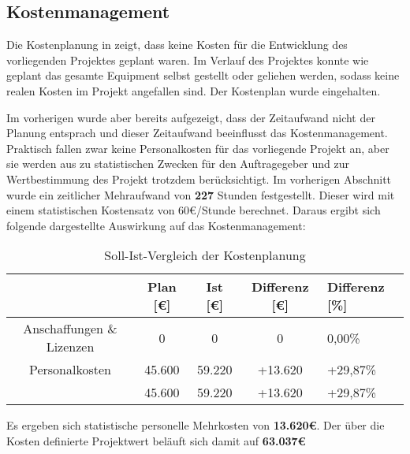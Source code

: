 \subsection{Kostenmanagement}
\label{sec:Kostenmanagement}


Die Kostenplanung in  zeigt, dass keine Kosten für die Entwicklung des vorliegenden Projektes
geplant waren. Im Verlauf des Projektes konnte wie geplant das gesamte Equipment selbst gestellt oder geliehen werden,
sodass keine realen Kosten im Projekt angefallen sind. Der Kostenplan wurde eingehalten.

Im vorherigen  wurde aber bereits aufgezeigt, dass der Zeitaufwand nicht der Planung entsprach und
dieser Zeitaufwand beeinflusst das Kostenmanagement. Praktisch fallen zwar keine Personalkosten für das vorliegende Projekt
an, aber sie werden aus zu statistischen Zwecken für den Auftragegeber und zur
Wertbestimmung des Projekt trotzdem berücksichtigt. Im vorherigen Abschnitt wurde ein zeitlicher Mehraufwand von \textbf{227} Stunden festgestellt. Dieser
wird mit einem statistischen Kostensatz von 60€/Stunde berechnet. Daraus ergibt sich folgende dargestellte
Auswirkung auf das Kostenmanagement:

\begin{table}[h]
\centering
\begin{tabular}{ccccl}
\hline
\multicolumn{1}{l}{}              & Plan {[}€{]} & Ist {[}€{]} & Differenz {[}€{]} & Differenz {[}\%{]} \\ \hline
Anschaffungen \& Lizenzen          & 0           & 0          & 0               & 0,00\%          \\ \hline
Personalkosten                    & 45.600      &  59.220    & +13.620          & +29,87\%         \\ \hline
                                  & 45.600      & 59.220     & +13.620          & +29,87\%          \\ \hline
\end{tabular}
\caption{Soll-Ist-Vergleich der Kostenplanung}%
\label{tab:SollIstVergleichKosten}%
\end{table}

Es ergeben sich statistische personelle Mehrkosten von \textbf{13.620€}. Der über die Kosten definierte Projektwert
beläuft sich damit auf \textbf{63.037€}

